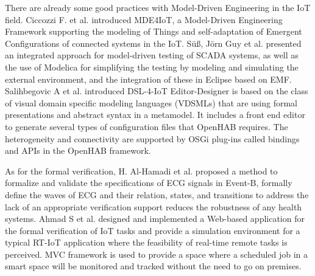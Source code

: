 \documentclass[11pt, oneside]{article}   	%
\begin{document}
\indent \par There are already some good practices with Model-Driven Engineering in the IoT field. Ciccozzi F. et al. \cite{ref5} introduced MDE4IoT, a Model-Driven Engineering Framework supporting the modeling of Things and self-adaptation of Emergent Conﬁgurations of connected systems in the IoT. Süß, Jörn Guy et al. \cite{ref6} presented an integrated approach for model-driven testing of SCADA systems, as well as the use of Modelica for simplifying the testing by modeling and simulating the external environment, and the integration of these in Eclipse based on EMF.  Salihbegovic A et al. \cite{ref9} introduced DSL-4-IoT Editor-Designer is based on the class of visual domain specific modeling languages (VDSMLs) that are using formal presentations and abstract syntax in a metamodel. It includes a front end editor to generate several types of configuration files that OpenHAB requires. The heterogeneity and connectivity are supported by OSGi plug-ins called bindings and APIs in the OpenHAB framework. \par


\indent \par As for the formal verification, H. Al-Hamadi et al.\cite{ref1} proposed a method to formalize and validate the specifications of ECG signals in Event-B, formally define the waves of ECG and their relation, states, and transitions to address the lack of an appropriate verification support reduces the robustness of any health systems. Ahmad S et al. \cite{ref13} designed and implemented a Web-based application for the formal verification of IoT tasks and provide a simulation environment for a typical RT-IoT application where the feasibility of real-time remote tasks is perceived. MVC framework is used to provide a space where a scheduled job in a smart space will be monitored and tracked without the need to go on premises.\par 
\end{document}
